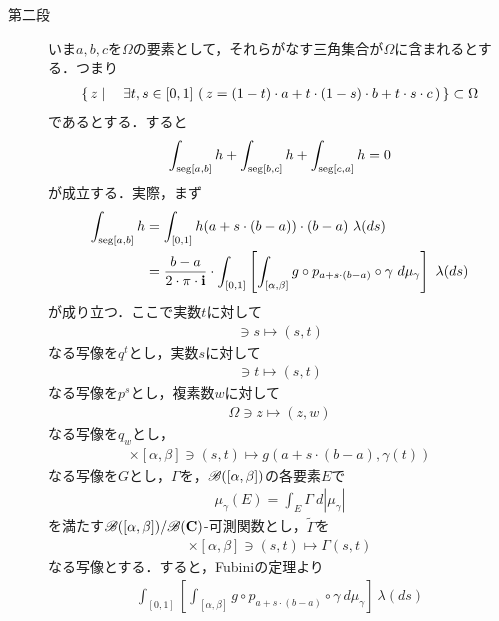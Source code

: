 \begin{sketch}[大雑把]
\begin{description}
			\item[第二段]
				いま$a,b,c$を$\Omega$の要素として，それらがなす三角集合が$\Omega$に含まれるとする．つまり
				\begin{align}
					\left\{\, z \mid \quad \exists t,s \in [0,1]\, 
					\left(\, z = (1-t) \cdot a 
					+ t \cdot (1-s) \cdot b 
					+ t \cdot s \cdot c\, \right)\, \right\} \subset \Omega
				\end{align}
				であるとする．すると
				\begin{align}
					\int_{\operatorname{seg}[a,b]} h + \int_{\operatorname{seg}[b,c]} h + \int_{\operatorname{seg}[c,a]} h = 0
				\end{align}
				が成立する．実際，まず
				\begin{align}
					\int_{\seg{a}{b}} h
					&= \int_{[0,1]} h(a+s \cdot (b-a)) \cdot (b-a)\ \lambda(ds) \\
					&= \frac{b-a}{2\cdot\pi\cdot\isym} \cdot \int_{[0,1]}
					\left[\int_{[\alpha,\beta]} g \circ p_{a+s \cdot (b-a)} \circ \gamma\ d\mu_{\gamma}\right]\ \lambda(ds)
				\end{align}
				が成り立つ．ここで実数$t$に対して
				\begin{align}
					[0,1] \ni s \longmapsto (s,t)
				\end{align}
				なる写像を$q^{t}$とし，実数$s$に対して
				\begin{align}
					[\alpha,\beta] \ni t \longmapsto (s,t)
				\end{align}
				なる写像を$p^{s}$とし，複素数$w$に対して
				\begin{align}
					\Omega \ni z \longmapsto (z,w)
				\end{align}
				なる写像を$q_{w}$とし，
				\begin{align}
					[0,1] \times [\alpha,\beta] \ni (s,t) \longmapsto g(a + s \cdot (b-a),\gamma(t))
				\end{align}
				なる写像を$G$とし，$\Gamma$を，$\mathscr{B}([\alpha,\beta])$の各要素$E$で
				\begin{align}
					\mu_{\gamma}(E) = \int_{E} \Gamma\ d|\mu_{\gamma}|
				\end{align}
				を満たす$\mathscr{B}([\alpha,\beta])/\mathscr{B}(\mathbf{C})$-可測関数とし，$\tilde{\Gamma}$を
				\begin{align}
					[0,1] \times [\alpha,\beta] \ni (s,t) \longmapsto \Gamma(s,t)
				\end{align}
				なる写像とする．すると，Fubiniの定理より
				\begin{align}
					\int_{[0,1]}
					\left[\int_{[\alpha,\beta]} g \circ p_{a+s \cdot (b-a)} \circ \gamma\ d\mu_{\gamma}\right]\ \lambda(ds)

\end{align}
\end{description}
\end{sketch}
